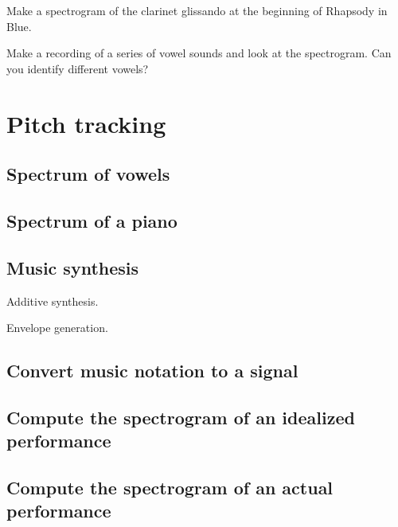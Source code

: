 \documentclass[12pt]{book}
\begin{document}
\begin{exercise}
Make a spectrogram of the clarinet glissando at the beginning of
Rhapsody in Blue.

\end{exercise}

\begin{exercise}
Make a recording of a series of vowel sounds and look at the spectrogram.
Can you identify different vowels?
\end{exercise}





\chapter{Pitch tracking}

\section{Spectrum of vowels}

\section{Spectrum of a piano}

\section{Music synthesis}

Additive synthesis.

Envelope generation.

\section{Convert music notation to a signal}

\section{Compute the spectrogram of an idealized performance}

\section{Compute the spectrogram of an actual performance}
\end{document}
